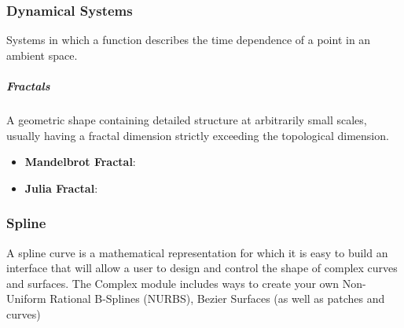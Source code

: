 \documentclass[12pt, letterpaper]{article}
\begin{document}
\begin{sloppypar}
\begin{flushleft}
\subsubsection{Dynamical Systems}
Systems in which a function describes the time dependence of a point in an ambient space. 
\subparagraph*{Fractals} A geometric shape containing detailed structure at arbitrarily 
small scales, usually having a fractal dimension strictly exceeding the topological 
dimension. \\

\begin{itemize}
\item \textbf{Mandelbrot Fractal}: \\

\item \textbf{Julia Fractal}: \\

\end{itemize}


\subsubsection{Spline}
A spline curve is a mathematical representation for which it is easy to build an interface 
that will allow a user to design and control the shape of complex curves and surfaces.
The Complex module includes ways to create your own Non-Uniform Rational B-Splines (NURBS),
Bezier Surfaces (as well as patches and curves)


\end{flushleft}
\end{sloppypar}
\end{document}
